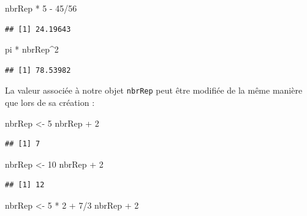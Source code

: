 \documentclass[twoside,symmetric]{book}
\newenvironment{Shaded}{}{}
\newcommand{\DecValTok}[1]{#1}
\newcommand{\NormalTok}[1]{#1}
\newcommand{\OperatorTok}[1]{#1}
\newcommand{\StringTok}[1]{#1}
\begin{document}
\begin{Shaded}
\begin{Highlighting}[]
\NormalTok{nbrRep }\OperatorTok{*}\StringTok{ }\DecValTok{5} \OperatorTok{-}\StringTok{ }\DecValTok{45}\OperatorTok{/}\DecValTok{56}
\end{Highlighting}
\end{Shaded}

\begin{verbatim}
## [1] 24.19643
\end{verbatim}

\begin{Shaded}
\begin{Highlighting}[]
\NormalTok{pi }\OperatorTok{*}\StringTok{ }\NormalTok{nbrRep}\OperatorTok{^}\DecValTok{2}
\end{Highlighting}
\end{Shaded}

\begin{verbatim}
## [1] 78.53982
\end{verbatim}

La valeur associée à notre objet \texttt{nbrRep} peut être modifiée de la même manière que lors de sa création :

\begin{Shaded}
\begin{Highlighting}[]
\NormalTok{nbrRep <-}\StringTok{ }\DecValTok{5}
\NormalTok{nbrRep }\OperatorTok{+}\StringTok{ }\DecValTok{2}
\end{Highlighting}
\end{Shaded}

\begin{verbatim}
## [1] 7
\end{verbatim}

\begin{Shaded}
\begin{Highlighting}[]
\NormalTok{nbrRep <-}\StringTok{ }\DecValTok{10}
\NormalTok{nbrRep }\OperatorTok{+}\StringTok{ }\DecValTok{2}
\end{Highlighting}
\end{Shaded}

\begin{verbatim}
## [1] 12
\end{verbatim}

\begin{Shaded}
\begin{Highlighting}[]
\NormalTok{nbrRep <-}\StringTok{ }\DecValTok{5} \OperatorTok{*}\StringTok{ }\DecValTok{2} \OperatorTok{+}\StringTok{ }\DecValTok{7}\OperatorTok{/}\DecValTok{3}
\NormalTok{nbrRep }\OperatorTok{+}\StringTok{ }\DecValTok{2}
\end{Highlighting}
\end{Shaded}
\end{document}
